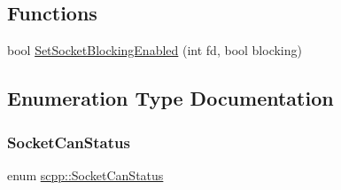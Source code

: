 \subsection*{Functions}
\begin{DoxyCompactItemize}
\item 
bool \hyperlink{namespacescpp_a7acc4f95274c9fdd3fccecbb5e0a9b4c}{Set\+Socket\+Blocking\+Enabled} (int fd, bool blocking)
\end{DoxyCompactItemize}


\subsection{Enumeration Type Documentation}
\mbox{\label{namespacescpp_abc60b9ed5f90c311397500d39ff15ef2}} 
\subsubsection{\texorpdfstring{Socket\+Can\+Status}{SocketCanStatus}}
{\footnotesize\ttfamily enum \hyperlink{namespacescpp_abc60b9ed5f90c311397500d39ff15ef2}{scpp\+::\+Socket\+Can\+Status}}

